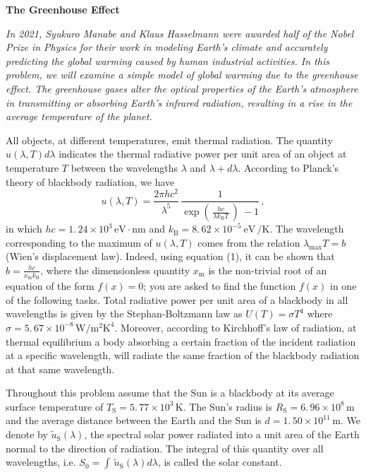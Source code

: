 \begin{center}{\large\textbf{The Greenhouse Effect}}\end{center}

\textit{In 2021, Syukuro Manabe and Klaus Hasselmann were awarded half of the
Nobel Prize in Physics for their work in modeling Earth's climate and
accurately predicting the global warming caused by human industrial
activities. In this problem, we will examine a simple model of global warming
due to the greenhouse effect. The greenhouse gases alter the optical properties
of the Earth's atmosphere in transmitting or absorbing Earth's infrared
radiation, resulting in a rise in the average temperature of the planet.}

All objects, at different temperatures, emit thermal radiation. The quantity
$u(\lambda, T)d\lambda$ indicates the thermal radiative power per unit area of
an object at temperature $T$ between the wavelengths $\lambda$ and
$\lambda + d\lambda$. According to Planck’s theory of blackbody radiation, we
have
\begin{equation}
u(\lambda, T) = \frac{2\pi hc^2}{\lambda^5}\,\frac{1}{\exp(\,\frac{hc}{\lambda k_\mathrm{B}T}\,)\ -1}\,, \tag{1}
\end{equation}
in which $hc = 1.\,24 \times 10^3\,\mathrm{eV\cdot nm}$ and
$k_\mathrm{B} = 8.\,62 \times 10^{-5}\ \mathrm{eV\,/K}$. The wavelength
corresponding to the maximum of $u(\lambda, T)$ comes from the relation
$\lambda_\mathrm{max}T = b$ (Wien’s displacement law). Indeed, using equation
(1), it can be shown that $b = \frac{hc}{x_\mathrm{m}k_\mathrm{B}}$, where the
dimensionless quantity $x_\mathrm{m}$ is the non-trivial root of an equation of
the form $f(x) = 0$; you are asked to find the function $f(x)$ in one of the
following tasks. Total radiative power per unit area of a blackbody in all
wavelengths is given by the Stephan-Boltzmann law as $U(T) = \sigma T^4$ where
$\sigma = 5.\,67 \times 10^{-8}\,\mathrm{W/m^2K^4}$. Moreover, according to
Kirchhoff’s law of radiation, at thermal equilibrium a body absorbing a certain
fraction of the incident radiation at a specific wavelength, will radiate the
same fraction of the blackbody radiation at that same wavelength.

Throughout this problem assume that the Sun is a blackbody at its average
surface temperature of $T_\mathrm{S} = 5.\,77 \times 10^3\,\mathrm{K}$. The
Sun’s radius is $R_\mathrm{S} = 6.\,96 \times 10^8\,\mathrm{m}$ and the average
distance between the Earth and the Sun is
$d = 1.\,50 \times 10^{11}\,\mathrm{m}$. We denote by
$\tilde{u}_\mathrm{S}(\lambda)$, the spectral solar power radiated into a unit
area of the Earth normal to the direction of radiation. The integral of this
quantity over all wavelengths, i.e.
$S_0 = \int\,\tilde{u}_\mathrm{S}(\lambda)d\lambda$, is called the solar
constant.

